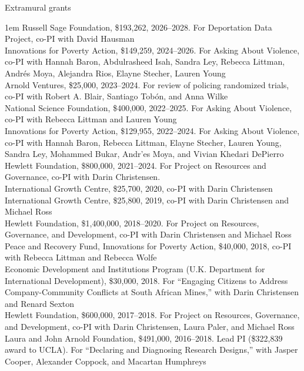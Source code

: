 \documentclass[10.9pt]{article}
\makeatletter
\newcommand\donotbreakhere{\par\nobreak\@afterheading\vspace{1em}}
\newenvironment{indnt}{\begin{adjustwidth}{1em}{}}{\end{adjustwidth}}
\makeatother
\begin{document}
{\large Extramural grants}\donotbreakhere
\begin{indnt}
Russell Sage Foundation, \$193,262, 2026--2028. For Deportation Data Project, co-PI with David Hausman\\[.75em]
Innovations for Poverty Action, \$149,259, 2024--2026. For Asking About Violence, co-PI with Hannah Baron, Abdulrasheed Isah, Sandra Ley, Rebecca Littman, Andr{\'e}s Moya, Alejandra Rios, Elayne Stecher, Lauren Young\\[.75em]
Arnold Ventures, \$25,000, 2023--2024. For review of policing randomized trials, co-PI with Robert A. Blair, Santiago Tob{\'on}, and Anna Wilke\\[0.75em]
National Science Foundation, \$400,000, 2022--2025. For Asking About Violence, co-PI with Rebecca Littman and Lauren Young\\[.75em]
Innovations for Poverty Action, \$129,955, 2022--2024. For Asking About Violence, co-PI with Hannah Baron, Rebecca Littman, Elayne Stecher, Lauren Young, Sandra Ley, Mohammed Bukar, Andr{'e}s Moya, and Vivian Khedari DePierro\\[.75em]
Hewlett Foundation, \$800,000, 2021--2024. For Project on Resources and Governance, co-PI with Darin Christensen. \\[.75em]
International Growth Centre, \$25,700, 2020, co-PI with Darin Christensen \\[.75em]
International Growth Centre, \$25,800, 2019, co-PI with Darin Christensen and Michael Ross \\[.75em]
Hewlett Foundation, \$1,400,000, 2018--2020. For Project on Resources, Governance, and Development, co-PI with Darin Christensen and Michael Ross \\[.75em]
Peace and Recovery Fund, Innovations for Poverty Action, \$40,000, 2018, co-PI with Rebecca Littman and Rebecca Wolfe \\[.75em]
Economic Development and Institutions Program (U.K. Department for International Development), \$30,000, 2018. For ``Engaging Citizens to Address Company-Community Conflicts at South African Mines,'' with Darin Christensen and Renard Sexton\\[.75em]
Hewlett Foundation, \$600,000, 2017--2018. For Project on Resources, Governance, and Development, co-PI with Darin Christensen, Laura Paler, and Michael Ross \\[.75em]
Laura and John Arnold Foundation, \$491,000, 2016--2018. Lead PI (\$322,839 award to UCLA). For ``Declaring and Diagnosing Research Designs,'' with Jasper Cooper, Alexander Coppock, and Macartan Humphreys \\[.75em]

\end{indnt}
\end{document}
